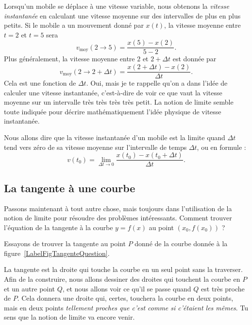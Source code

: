 Lorsqu'un mobile se déplace à une vitesse variable, nous obtenons la \emph{vitesse instantanée} en calculant une vitesse moyenne sur des intervalles de plus en plus petits. Si le mobile a un mouvement donné par $x(t)$, la vitesse moyenne entre $t=2$ et $t=5$ sera
\[
  v_{\text{moy}}(2\to 5)=\frac{ x(5)-x(2) }{ 5-2 }.
\]
Plus généralement, la vitesse moyenne entre $2$ et $2+\Delta t$ est donnée par
\[
  v_{\text{moy}}(2\to 2+\Delta t)=\frac{ x(2+\Delta t)-x(2) }{ \Delta t }.
\]
Cela est une fonction de $\Delta t$. Oui, mais je te rappelle qu'on a dans l'idée de calculer une vitesse instantanée, c'est-à-dire de voir ce que vaut la vitesse moyenne sur un intervalle très {\small très} {\footnotesize très} {\scriptsize très} {\tiny petit}. La notion de limite semble toute indiquée pour décrire mathématiquement l'idée physique de vitesse instantanée.

Nous allons dire que la vitesse instantanée d'un mobile est la limite quand $\Delta t$ tend vers zéro de sa vitesse moyenne sur l'intervalle de temps $\Delta t$, ou en formule :
\begin{equation}		\label{Eqvinstlimite}
	v(t_0)=\lim_{\Delta t\to 0}\frac{ x(t_0)-x(t_0+\Delta t) }{ \Delta t }.
\end{equation}

\subsection{La tangente à une courbe}

Passons maintenant à tout autre chose, mais toujours dans l'utilisation de la notion de limite pour résoudre des problèmes intéressants. Comment trouver l'équation de la tangente à la courbe $y=f(x)$ au point $(x_0,f(x_0))$ ?

Essayons de trouver la tangente au point $P$ donné de la courbe donnée à la figure~\ref{LabelFigTangenteQuestion}.

\newcommand{\CaptionFigTangenteQuestion}{Comment trouver la tangente à la courbe au point $P$ ?}


La tangente est la droite qui touche la courbe en un seul point sans la traverser. Afin de la construire, nous allons dessiner des droites qui touchent la courbe en $P$ et un autre point $Q$, et nous allons voir ce qu'il se passe quand $Q$ est très proche de $P$. Cela donnera une droite qui, certes, touchera la courbe en deux points, mais en deux points \emph{tellement proches que c'est comme si c'étaient les mêmes}. Tu sens que la notion de limite va encore venir.

